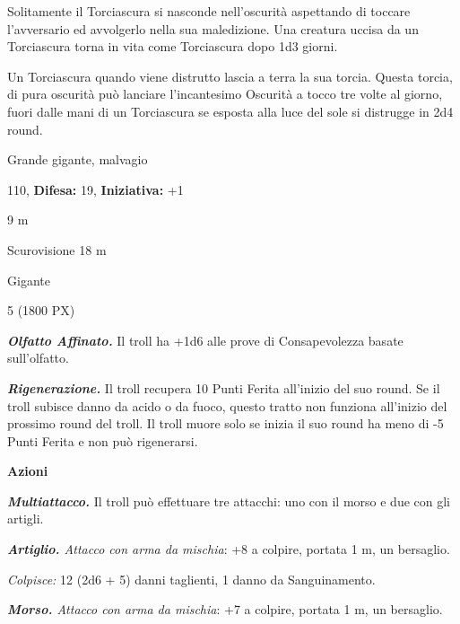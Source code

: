 \begin{multicols}{2}
{Solitamente il Torciascura si nasconde nell'oscurità aspettando di toccare l'avversario ed avvolgerlo nella sua maledizione. Una creatura uccisa da un Torciascura torna in vita come Torciascura dopo 1d3 giorni.

Un Torciascura quando viene distrutto lascia a terra la sua torcia. Questa torcia, di pura oscurità può lanciare l'incantesimo Oscurità a tocco tre volte al giorno, fuori dalle mani di un Torciascura se esposta alla luce del sole si distrugge in 2d4 round.

\noindent
\begin{description}[noitemsep, topsep=0pt, parsep=0pt, partopsep=0pt, leftmargin=0cm, labelwidth=2.2cm]
	\item[\textbf{Taglia/Tipo:}] Grande gigante, malvagio
	\item[\textbf{Caratt.:}] 
	\item[\textbf{Punti Ferita:}] 110,  \textbf{Difesa:} 19,  \textbf{Iniziativa:} +1
	\item[\textbf{Movimento:}] 9 m
	\item[\textbf{Tiri Salvez.:}] 
	\item[\textbf{Sensi:}] Scurovisione 18 m
	\item[\textbf{Linguaggi:}] Gigante
	\item[\textbf{Sfida:}] 5 (1800 PX)\smallskip
\end{description}

\emph{\textbf{Olfatto Affinato.}} Il troll ha +1d6 alle prove di Consapevolezza basate sull'olfatto.

\emph{\textbf{Rigenerazione.}} Il troll recupera 10 Punti Ferita all'inizio del suo round. Se il troll subisce danno da acido o da fuoco, questo tratto non funziona all'inizio del prossimo round del troll. Il troll muore solo se inizia il suo round ha meno di -5 Punti Ferita e non può rigenerarsi.

\textbf{Azioni}

\emph{\textbf{Multiattacco.}} Il troll può effettuare tre attacchi: uno con il morso e due con gli artigli.

\emph{\textbf{Artiglio.} Attacco con arma da mischia}: +8 a colpire, portata 1 m, un bersaglio.

\emph{Colpisce:} 12 (2d6 + 5) danni taglienti, 1 danno da Sanguinamento.

\emph{\textbf{Morso.} Attacco con arma da mischia}: +7 a colpire, portata 1 m, un bersaglio.

}
\end{multicols}
